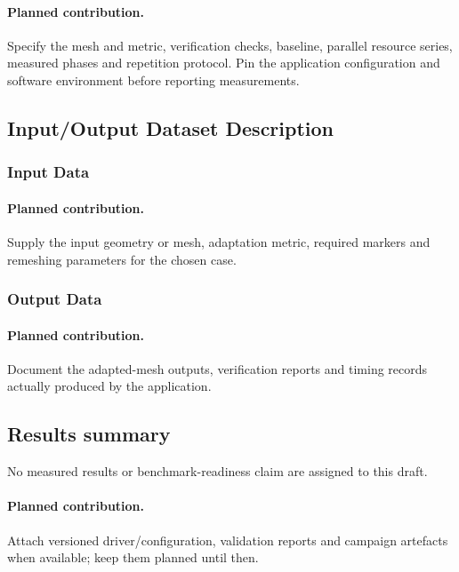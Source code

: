 \paragraph{Planned contribution.} Specify the mesh and metric, verification
checks, baseline, parallel resource series, measured phases and repetition
protocol. Pin the application configuration and software environment before
reporting measurements.

\subsection{Input/Output Dataset Description}
\subsubsection{Input Data}
\paragraph{Planned contribution.} Supply the input geometry or mesh,
adaptation metric, required markers and remeshing parameters for the chosen case.

\subsubsection{Output Data}
\paragraph{Planned contribution.} Document the adapted-mesh outputs,
verification reports and timing records actually produced by the application.

\subsection{Results summary}
No measured results or benchmark-readiness claim are assigned to this draft.
\paragraph{Planned contribution.} Attach versioned driver/configuration,
validation reports and campaign artefacts when available; keep them planned until then.


